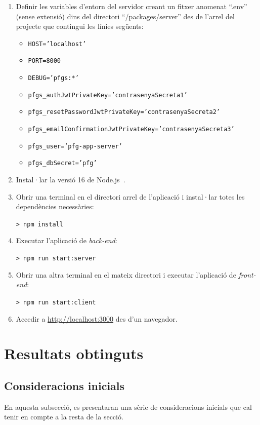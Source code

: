 \documentclass[a4paper,12pt]{ThesisStyle}
\begin{document}
\begin{enumerate}
  \item Definir les variables d'entorn del servidor creant un fitxer anomenat ``.env'' (sense extensió) dins del directori ``/packages/server'' des de l'arrel del projecte que contingui les línies següents:
  \begin{itemize}
    \item \texttt{HOST='localhost'}
    \item \texttt{PORT=8000}
    \item \texttt{DEBUG='pfgs:*'}
    \item \texttt{pfgs\_authJwtPrivateKey='contrasenyaSecreta1'}
    \item \texttt{pfgs\_resetPasswordJwtPrivateKey='contrasenyaSecreta2'}
    \item \texttt{pfgs\_emailConfirmationJwtPrivateKey='contrasenyaSecreta3'}
    \item \texttt{pfgs\_user='pfg-app-server'}
    \item \texttt{pfgs\_dbSecret='pfg'}
  \end{itemize}
  \item Instal·lar la versió 16 de Node.js~\cite{Node}.
  \item Obrir una terminal en el directori arrel de l'aplicació i instal·lar totes les dependències necessàries:\\
    \centerline{\texttt{> npm install}}
  \item Executar l'aplicació de \textit{back-end}:\\
    \centerline{\texttt{> npm run start:server}}
  \item Obrir una altra terminal en el mateix directori i executar l'aplicació de \textit{front-end}:\\
    \centerline{\texttt{> npm run start:client}}
  \item Accedir a \href{http://localhost:3000}{http://localhost:3000} des d'un navegador.
\end{enumerate}

\section{Resultats obtinguts}
\label{sec:resultats}

\subsection{Consideracions inicials}
\label{subsec:resultats_consideracions}

En aquesta subsecció, es presentaran una sèrie de consideracions inicials que cal tenir en compte a la resta de la secció.
\end{document}
